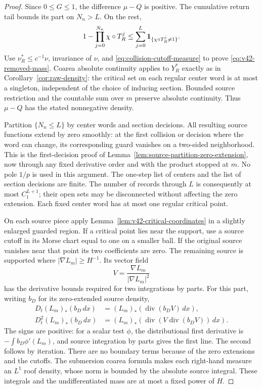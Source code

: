 \begin{proof}
Since $0\le G\le1$, the difference $\mu-Q$ is positive. The cumulative
return tail bounds its part on $N_n>L$. On the rest,
\[
 1-\prod_{j=0}^{N_n}\chi\circ T_R^j
       \le\sum_{j=0}^{L}\mathbf1_{\{\chi\circ T_R^j\ne1\}}.
\]
Use $\nu_R^*\le c^{-1}\nu$, invariance of $\nu$, and
\eqref{eq:collision-cutoff-measure} to prove
\eqref{eq:v42-removed-mass}. Coarea absolute continuity applies to
$Y_R^*$ exactly as in Corollary~\ref{cor:raw-density}: the critical
set on each regular center word is at most a singleton, independent
of the choice of inducing section. Bounded source restriction and the
countable sum over $m$ preserve absolute continuity. Thus $\mu-Q$
has the stated nonnegative density.

Partition $\{N_n\le L\}$ by center words and section decisions.
All resulting source functions extend by zero smoothly: at the first
collision or decision where the word can change, its corresponding
guard vanishes on a two-sided neighborhood. This is the
first-decision proof of Lemma~\ref{lem:source-partition-zero-extension},
now through any fixed derivative order and with the product stopped
at $m$. No pole $1/p$ is used in this argument. The one-step list of
centers and the list of section decisions are finite. The number of
records through $L$ is consequently at most $C_1^{L+1}$; their open
sets may be disconnected without affecting the zero extension.
Each fixed center word has at most one regular critical point.

On each source piece apply Lemma~\ref{lem:v42-critical-coordinates}
in a slightly enlarged guarded region. If a critical point lies near
the support, use a source cutoff in its Morse chart equal to one on
a smaller ball. If the original source vanishes near that point its
two coefficients are zero. The remaining source is supported where
$|\nabla L_m|\ge H^{-1}$. Its vector field
\[
 V=\frac{\nabla L_m}{|\nabla L_m|^2}
\]
has the derivative bounds required for two integrations by parts.
For this part, writing $b_D$ for its zero-extended source density,
\begin{align*}
 D_t(L_m)_*(b_D\,dx)&=(L_m)_*(\operatorname{div}(b_DV)\,dx),\\
 D_t^2(L_m)_*(b_D\,dx)
  &=(L_m)_*(\operatorname{div}(V\operatorname{div}(b_DV))\,dx).
\end{align*}
The signs are positive: for a scalar test $\phi$, the distributional
first derivative is $-\int b_D\phi'(L_m)$, and source integration
by parts gives the first line. The second follows by iteration.
There are no boundary terms because of the zero extensions and the
cutoffs. The submersion coarea formula makes each right-hand measure
an $L^1$ roof density, whose norm is bounded by the absolute source
integral. These integrals and the undifferentiated mass are at most
a fixed power of $H$.


\end{proof}
